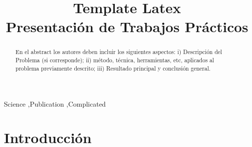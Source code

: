\documentclass[1p,12pt]{elsarticle}
\begin{document}
\begin{frontmatter}



\title{Template Latex \\ Presentación de Trabajos Prácticos}




\begin{abstract}
En el abstract los autores deben incluir los siguientes aspectos: i) Descripción del Problema (si corresponde); ii) método, técnica, herramientas, etc, aplicados al problema previamente descrito; iii) Resultado principal y conclusión general.
\end{abstract}

\begin{keyword}
Science \sep Publication \sep Complicated


\end{keyword}

\end{frontmatter}


\section{Introducción}
\label{sec:intro}
\end{document}
